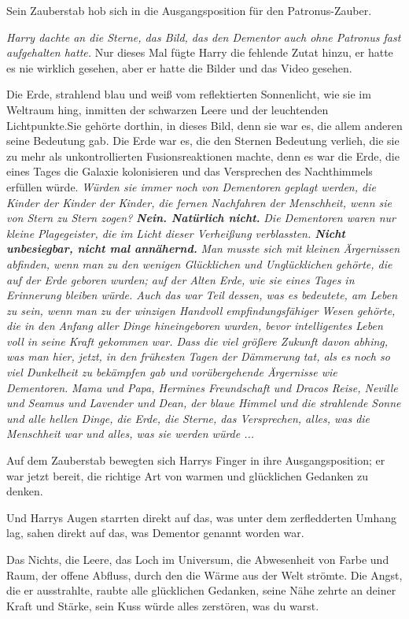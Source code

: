 Sein Zauberstab hob sich in die Ausgangsposition für den Patronus-Zauber.

\emph{Harry dachte an die Sterne, das Bild, das den Dementor auch ohne Patronus
fast aufgehalten hatte.} Nur dieses Mal fügte Harry die fehlende Zutat hinzu, er
hatte es nie wirklich gesehen, aber er hatte die Bilder und das Video gesehen.

Die Erde, strahlend blau und weiß vom reflektierten Sonnenlicht, wie sie im
Weltraum hing, inmitten der schwarzen Leere und der leuchtenden Lichtpunkte.Sie
gehörte dorthin, in dieses Bild, denn sie war es, die allem anderen seine
Bedeutung gab. Die Erde war es, die den Sternen Bedeutung verlieh, die sie zu
mehr als unkontrollierten Fusionsreaktionen machte, denn es war die Erde, die
eines Tages die Galaxie kolonisieren und das Versprechen des Nachthimmels
erfüllen würde. \emph{ Würden sie immer noch von Dementoren geplagt werden, die
Kinder der Kinder der Kinder, die fernen Nachfahren der Menschheit, wenn sie von
Stern zu Stern zogen?} \emph{\textbf{Nein. Natürlich nicht.} } \emph{Die
Dementoren waren nur kleine Plagegeister, die im Licht dieser Verheißung
verblassten. \textbf{Nicht unbesiegbar, nicht mal annähernd.}} \emph{Man musste
sich mit kleinen Ärgernissen abfinden, wenn man zu den wenigen Glücklichen und
Unglücklichen gehörte, die auf der Erde geboren wurden; auf der Alten Erde, wie
sie eines Tages in Erinnerung bleiben würde. Auch das war Teil dessen, was es
bedeutete, am Leben zu sein, wenn man zu der winzigen Handvoll
empfindungsfähiger Wesen gehörte, die in den Anfang aller Dinge hineingeboren
wurden, bevor intelligentes Leben voll in seine Kraft gekommen war. Dass die
viel größere Zukunft davon abhing, was man hier, jetzt, in den frühesten Tagen
der Dämmerung tat, als es noch so viel Dunkelheit zu bekämpfen gab und
vorübergehende Ärgernisse wie Dementoren.} \emph{ Mama und Papa, Hermines
Freundschaft und Dracos Reise, Neville und Seamus und Lavender und Dean, der
blaue Himmel und die strahlende Sonne und alle hellen Dinge, die Erde, die
Sterne, das Versprechen, alles, was die Menschheit war und alles, was sie werden
würde ...}

Auf dem Zauberstab bewegten sich Harrys Finger in ihre Ausgangsposition; er
war jetzt bereit, die richtige Art von warmen und glücklichen Gedanken zu
denken.

Und Harrys Augen starrten direkt auf das, was unter dem zerfledderten Umhang
lag, sahen direkt auf das, was Dementor genannt worden war.

Das Nichts, die Leere, das Loch im Universum, die Abwesenheit von Farbe und
Raum, der offene Abfluss, durch den die Wärme aus der Welt strömte. Die Angst,
die er ausstrahlte, raubte alle glücklichen Gedanken, seine Nähe zehrte an
deiner Kraft und Stärke, sein Kuss würde alles zerstören, was du warst.

